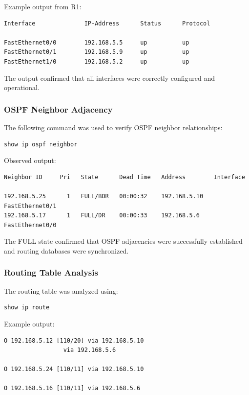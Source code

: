 \documentclass[12pt]{article}
\begin{document}
Example output from R1:

\begin{lstlisting}
Interface              IP-Address      Status      Protocol

FastEthernet0/0        192.168.5.5     up          up
FastEthernet0/1        192.168.5.9     up          up
FastEthernet1/0        192.168.5.2     up          up
\end{lstlisting}

The output confirmed that all interfaces were correctly configured and operational.

\subsubsection{OSPF Neighbor Adjacency}

The following command was used to verify OSPF neighbor relationships:

\begin{lstlisting}
show ip ospf neighbor
\end{lstlisting}

Observed output:

\begin{lstlisting}
Neighbor ID     Pri   State      Dead Time   Address        Interface

192.168.5.25      1   FULL/BDR   00:00:32    192.168.5.10  FastEthernet0/1
192.168.5.17      1   FULL/DR    00:00:33    192.168.5.6   FastEthernet0/0
\end{lstlisting}

The FULL state confirmed that OSPF adjacencies were successfully established and routing databases were synchronized.

\newpage
\subsubsection{Routing Table Analysis}

The routing table was analyzed using:

\begin{lstlisting}
show ip route
\end{lstlisting}

Example output:

\begin{lstlisting}
O 192.168.5.12 [110/20] via 192.168.5.10
                 via 192.168.5.6

O 192.168.5.24 [110/11] via 192.168.5.10

O 192.168.5.16 [110/11] via 192.168.5.6
\end{lstlisting}
\end{document}
